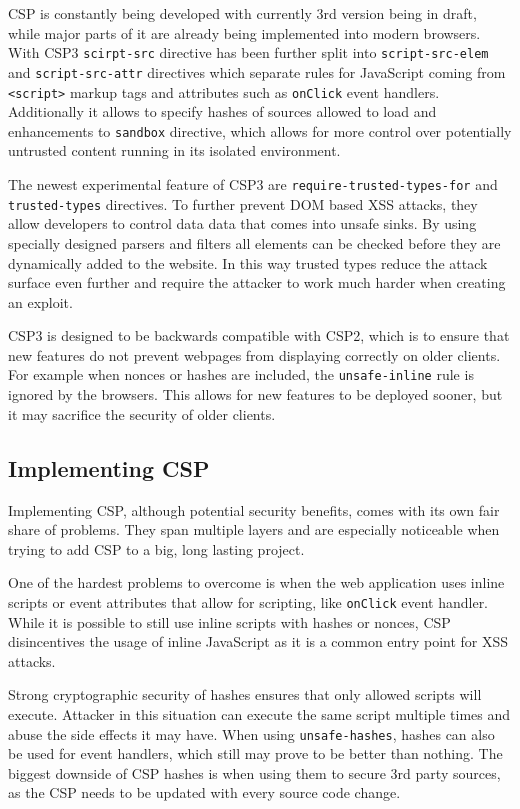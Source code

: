 \documentclass[12]{article}   %
\begin{document}
CSP is constantly being developed with currently 3rd version being in draft, while major parts of it are already being implemented into modern browsers.
With CSP3 \texttt{scirpt-src} directive has been further split into \texttt{script-src-elem} and \texttt{script-src-attr} directives which separate rules for JavaScript coming from \texttt{<script>} markup tags and attributes such as \texttt{onClick} event handlers.
Additionally it allows to specify hashes of sources allowed to load and enhancements to \texttt{sandbox} directive, which allows for more control over potentially untrusted content running in its isolated environment.

The newest experimental feature of CSP3 are \texttt{require-trusted-types-for} and \texttt{trusted-types} directives. \cite{TTwebdev} \cite{TTmozdev}
To further prevent DOM based XSS attacks, they allow developers to control data data that comes into unsafe sinks.
By using specially designed parsers and filters all elements can be checked before they are dynamically added to the website.
In this way trusted types reduce the attack surface even further and require the attacker to work much harder when creating an exploit.

CSP3 is designed to be backwards compatible with CSP2, which is to ensure that new features do not prevent webpages from displaying correctly on older clients.
For example when nonces or hashes are included, the \texttt{unsafe-inline} rule is ignored by the browsers.
This allows for new features to be deployed sooner, but it may sacrifice the security of older clients.


\subsection{Implementing CSP}
Implementing CSP, although potential security benefits, comes with its own fair share of problems. 
They span multiple layers and are especially noticeable when trying to add CSP to a big, long lasting project.

One of the hardest problems to overcome is when the web application uses inline scripts or event attributes that allow for scripting, like \texttt{onClick} event handler.
While it is possible to still use inline scripts with hashes or nonces, CSP disincentives the usage of inline JavaScript as it is a common entry point for XSS attacks. 

Strong cryptographic security of hashes ensures that only allowed scripts will execute. 
Attacker in this situation can execute the same script multiple times and abuse the side effects it may have.
When using \texttt{unsafe-hashes}, hashes can also be used for event handlers, which still may prove to be better than nothing.
The biggest downside of CSP hashes is when using them to secure 3rd party sources, as the CSP needs to be updated with every source code change.
\end{document}
